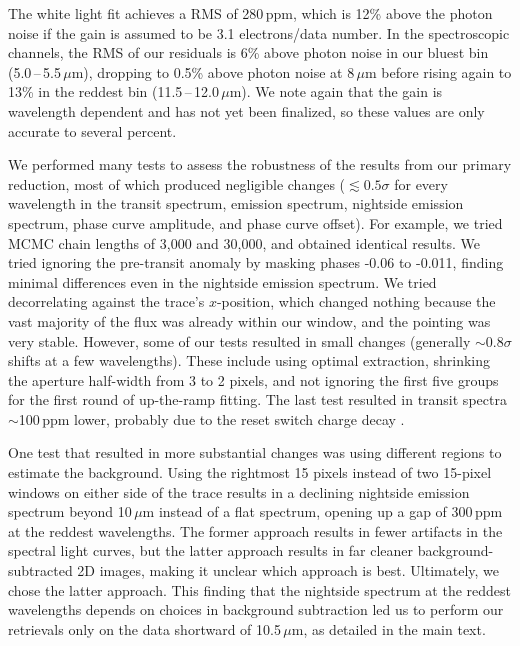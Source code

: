 \documentclass[pdflatex,sn-standardnature]{sn-jnl}%
\begin{document}
The white light fit achieves a RMS of 280\,ppm, which is 12\% above the photon noise if the gain is assumed to be 3.1 electrons/data number.  In the spectroscopic channels, the RMS of our residuals is 6\% above photon noise in our bluest bin (5.0\,--\,5.5\,$\mu$m), dropping to 0.5\% above photon noise at 8\,$\mu$m before rising again to 13\% in the reddest bin (11.5\,--\,12.0\,$\mu$m).  We note again that the gain is wavelength dependent and has not yet been finalized, so these values are only accurate to several percent.

We performed many tests to assess the robustness of the results from our primary reduction, most of which produced negligible changes ($\lesssim 0.5\sigma$ for every wavelength in the transit spectrum, emission spectrum, nightside emission spectrum, phase curve amplitude, and phase curve offset).  For example, we tried MCMC chain lengths of 3,000 and 30,000, and obtained identical results.  We tried ignoring the pre-transit anomaly by masking phases -0.06 to -0.011, finding minimal differences even in the nightside emission spectrum.  We tried decorrelating against the trace's $x$-position, which changed nothing because the vast majority of the flux was already within our window, and the pointing was very stable.  However, some of our tests resulted in small changes (generally $\sim$0.8$\sigma$ shifts at a few wavelengths).  These include using optimal extraction, shrinking the aperture half-width from 3 to 2 pixels, and not ignoring the first five groups for the first round of up-the-ramp fitting.  The last test resulted in transit spectra $\sim$100\,ppm lower, probably due to the reset switch charge decay \citep{argyriou_phd}.

One test that resulted in more substantial changes was using different regions to estimate the background.  Using the rightmost 15 pixels instead of two 15-pixel windows on either side of the trace results in a declining nightside emission spectrum beyond 10\,$\mu$m instead of a flat spectrum, opening up a gap of 300\,ppm at the reddest wavelengths.  The former approach results in fewer
artifacts in the spectral light curves, but the latter approach results in far cleaner background-subtracted 2D images, making it unclear which approach is best.  Ultimately, we chose the latter approach.  This finding that the nightside spectrum at the reddest wavelengths depends on choices in background subtraction led us to perform our retrievals only on the data shortward of 10.5\,$\mu$m, as detailed in the main text. 
\end{document}
